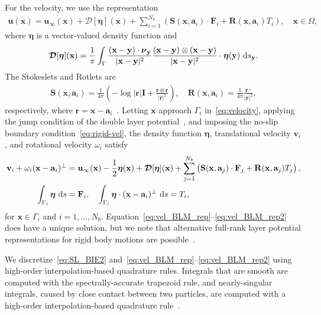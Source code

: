 \documentclass[prb,preprint,showpacs,preprintnumbers,amsmath,amssymb,longbibliography]{revtex4-1}
\renewcommand{\aa}{\mathbf{a}}
\newcommand{\DDD}{\boldsymbol{\mathcal{D}}}
\newcommand{\eeta}{\boldsymbol{\eta}}
\newcommand{\FF}{\mathbf{F}}
\newcommand{\nnu}{\boldsymbol{\nu}}
\newcommand{\rr}{\mathbf{r}}
\newcommand{\RR}{\mathbf{R}}
\renewcommand{\SS}{\mathbf{S}}
\newcommand{\xx}{\mathbf{x}}
\newcommand{\uu}{\mathbf{u}}
\renewcommand{\vv}{\mathbf{v}}
\newcommand{\yy}{\mathbf{y}}
\begin{document}
For the velocity, we use the representation
\begin{align}
  \label{eq:velocity}
  \uu(\xx) = \uu_\infty(\xx) + \DDD[\eeta](\xx) + 
    \sum_{i=1}^{N_b} \left(\SS(\xx,\aa_i) \cdot \FF_i + 
    \RR(\xx,\aa_i) T_i\right), \quad \xx \in \Omega,
\end{align}
where $\eeta$ is a vector-valued density function and
\begin{align}
  \DDD[\eeta](\xx) = \frac{1}{\pi} \int_{\Gamma} 
    \frac{(\xx - \yy) \cdot \nnu_\yy}{|\xx - \yy|^2}
    \frac{(\xx - \yy) \otimes (\xx - \yy)}{|\xx - \yy|^2}
    \cdot \eeta(\yy)\, \dif s_\yy.
\end{align}
The Stokeslets and Rotlets are
\begin{align}
  \SS(\xx,\aa_i) = \frac{1}{4\pi} \left(-\log |\rr|\mathbf{I} +
    \frac{\rr \otimes \rr}{|\rr|^2}\right), \quad 
  \RR(\xx,\aa_i) = \frac{1}{4\pi} \frac{\rr^\perp}{|\rr|^2}, 
\end{align}
respectively, where $\rr = \xx - \aa_i$~\cite{pow-mir1987}. Letting
$\xx$ approach $\Gamma_i$ in~\eqref{eq:velocity}, applying the jump
condition of the double layer potential~\cite{poz1992}, and imposing the
no-slip boundary condition~\eqref{eq:rigid-vel}, the density function
$\eeta$, translational velocity $\vv_i$, and rotational velocity
$\omega_i$ satisfy
\begin{alignat}{3}
  \label{eq:vel_BLM_rep}
  \vv_i + \omega_i (\xx - \aa_i)^\perp &= \uu_\infty(\xx)
    -\frac{1}{2} \eeta(\xx) + \DDD[\eeta](\xx) 
    + \sum_{j=1}^{N_b} 
    \left(\SS(\xx,\aa_j) \cdot \FF_j + \RR(\xx,\aa_j) T_j\right),\\
  \label{eq:vel_BLM_rep2}
  \int_{\Gamma_i} \eeta \, \dif s &= \mathbf{F}_i, \quad
  \int_{\Gamma_i} \eeta \cdot (\xx-\aa_i)^\perp \, \dif s = T_i,
\end{alignat}
for $\xx \in \Gamma_i$ and $i = 1,\ldots,N_b$.
Equation~\eqref{eq:vel_BLM_rep}--\eqref{eq:vel_BLM_rep2} does have a
unique solution, but we note that alternative full-rank layer potential
representations for rigid body motions are possible~\cite{rac-gre2016,
cor-gre-rac-vee2017}.

We discretize~\eqref{eq:SL_BIE2}
and~\eqref{eq:vel_BLM_rep}--\eqref{eq:vel_BLM_rep2} using high-order
interpolation-based quadrature rules. Integrals that are smooth are
computed with the spectrally-accurate trapezoid rule, and
nearly-singular integrals, caused by close contact between two
particles, are computed with a high-order interpolation-based quadrature
rule~\cite{qua-bir2014}.
\end{document}
